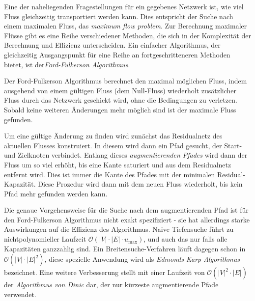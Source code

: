 Eine der naheliegenden Fragestellungen für ein gegebenes Netzwerk ist, wie viel Fluss gleichzeitig transportiert werden kann. Dies entspricht der Suche nach einem maximalen Fluss, das \emph{maximum flow problem}. Zur Berechnung maximaler Flüsse gibt es eine Reihe verschiedener Methoden, die sich in der Komplexität der Berechnung und Effizienz unterscheiden. Ein einfacher Algorithmus, der gleichzeitig Ausgangspunkt für eine Reihe an fortgeschritteneren Methoden bietet, ist der\emph{Ford-Fulkerson Algorithmus}. \cite{Ford-Fulkerson_algo}

Der Ford-Fulkerson Algorithmus berechnet den maximal möglichen Fluss, indem ausgehend von einem gültigen Fluss (dem Null-Fluss) wiederholt zusätzlicher Fluss durch das Netzwerk geschickt wird, ohne die Bedingungen zu verletzen. Sobald keine weiteren Änderungen mehr möglich sind ist der maximale Fluss gefunden.

Um eine gültige Änderung zu finden wird zunächst das Residualnetz des aktuellen Flusses konstruiert. In diesem wird dann ein Pfad gesucht, der Start- und Zielknoten verbindet. Entlang dieses \emph{augmentierenden Pfades} wird dann der Fluss um so viel erhöht, bis eine Kante saturiert und aus dem Residualnetz entfernt wird. Dies ist immer die Kante des Pfades mit der minimalen Residual-Kapazität. Diese Prozedur wird dann mit dem neuen Fluss wiederholt, bis kein Pfad mehr gefunden werden kann.

Die genaue Vorgehensweise für die Suche nach dem augmentierenden Pfad ist für den Ford-Fulkerson Algorithmus nicht exakt spezifiziert - sie hat allerdings starke Auswirkungen auf die Effizienz des Algorithmus. Naive Tiefensuche führt zu nichtpolynomieller Laufzeit $\mathcal{O}\left(|V|\cdot |E|\cdot u_{\max}\right)$, und auch das nur falls alle Kapazitäten ganzzahlig sind. Ein Breitensuche-Verfahren läuft dagegen schon in $\mathcal{O}(|V| \cdot |E|^2)$, diese spezielle Anwendung wird als \emph{Edmonds-Karp-Algorithmus} bezeichnet. \cite{Edmonds_karp} Eine weitere Verbesserung stellt mit einer Laufzeit von $\mathcal{O}(|V|^2 \cdot |E|)$ der \emph{Algorithmus von Dinic} dar, der nur kürzeste augmentierende Pfade verwendet. \cite{dinic70}\cite{Dinic}

